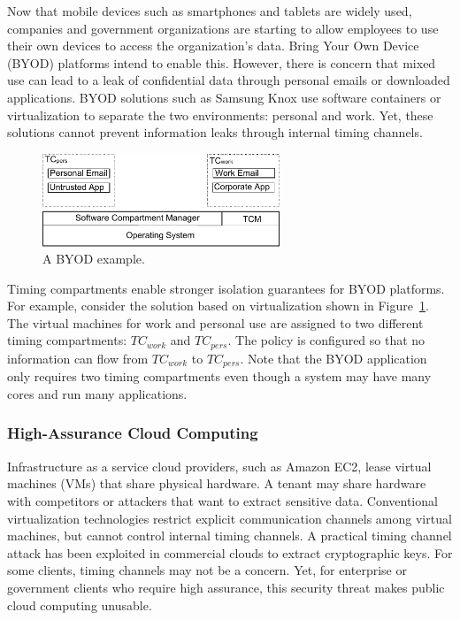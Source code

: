 Now that mobile devices such as smartphones and tablets are widely used, 
companies and government organizations are starting to allow employees to
use their own devices to access the organization's data.
Bring Your Own Device (BYOD) platforms intend to enable this. However, there is 
concern that mixed use can lead to a leak of confidential data through personal 
emails or
downloaded applications. BYOD solutions such as Samsung Knox use
software containers or virtualization to separate the two environments:
personal and work. Yet, these solutions cannot prevent information leaks
through internal timing channels.

\begin{figure}
    \begin{center}
        \includegraphics[width=2.79in]{figs/byod.pdf}
        \caption{A BYOD example.}
        \label{fig:byod}
    \end{center}
\end{figure}

Timing compartments enable stronger isolation guarantees for BYOD
platforms. For example, consider the solution based on virtualization shown in 
Figure~\ref{fig:byod}. The virtual machines for
work and personal use are assigned to two different timing compartments:
$TC_{work}$ and $TC_{pers}$. The policy is configured so that no information can 
flow from $TC_{work}$ to $TC_{pers}$.
Note that the BYOD application only requires two timing compartments even
though a system may have many cores and run many applications.

\subsubsection{High-Assurance Cloud Computing}

Infrastructure as a service cloud providers, such as Amazon EC2, lease virtual 
machines (VMs) that share physical hardware. 
A tenant may share hardware with competitors or attackers that want
to extract sensitive data. Conventional virtualization technologies restrict 
explicit
communication channels among virtual machines, but cannot control internal
timing channels. A practical timing channel attack has been exploited
in commercial clouds to extract cryptographic keys\cite{heyyou}.
For some clients, timing channels may not be a concern. Yet, for enterprise or 
government clients who require high assurance,
this security threat makes public cloud computing unusable. 

